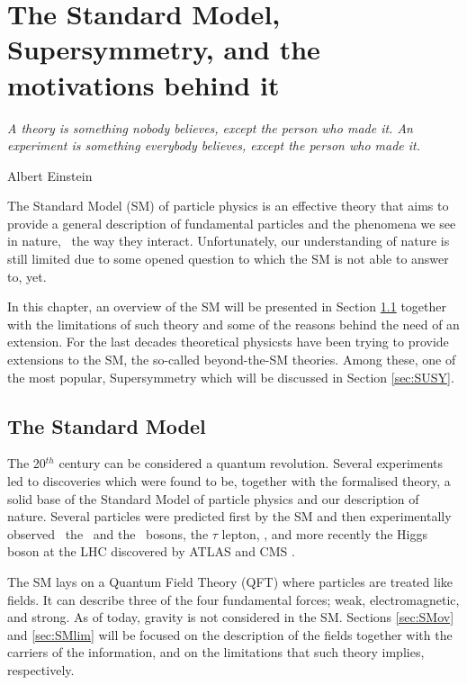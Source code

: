 \chapter{The Standard Model, Supersymmetry, and the motivations behind it}
\label{ch:theory} \epigraph{\emph{A theory is something nobody believes, except the person who made it. An experiment is something everybody believes, except the person who made it.}} {Albert Einstein}

	The Standard Model (SM) of particle physics is an effective theory that aims to provide a general description of fundamental particles and the phenomena we see in nature, \ie\ the way they interact. Unfortunately, our understanding of nature is still limited due to some opened question to which the SM is not able to answer to, yet. 

	In this chapter, an overview of the SM will be presented in Section \ref{sec:SM} together with the limitations of such theory and some of the reasons behind the need of an extension. For the last decades theoretical physicsts have been trying to provide extensions to the SM, the so-called beyond-the-SM theories. Among these, one of the most popular, Supersymmetry which will be discussed in Section \ref{sec:SUSY}.  

	
	\section{The Standard Model}
	\label{sec:SM}

		The 20$^{th}$ century can be considered a quantum revolution. Several experiments led to discoveries which were found to be, together with the formalised theory, a solid base of the Standard Model of particle physics and our description of nature. Several particles were predicted first by the SM and then experimentally observed \eg\ the \Wboson\ and the \Zboson\ bosons, the $\tau$ lepton, \cite{Herrero1998}, and more recently the Higgs boson at the LHC discovered by ATLAS \cite{ATLASHiggs2012} and CMS \cite{CMSHiggs2012}.

		The SM lays on a Quantum Field Theory (QFT) where particles are treated like fields. It can describe three of the four fundamental forces; weak, electromagnetic, and strong. As of today, gravity is not considered in the SM. Sections \ref{sec:SMov} and \ref{sec:SMlim} will be focused on the description of the fields together with the carriers of the information, and on the limitations that such theory implies, respectively.


